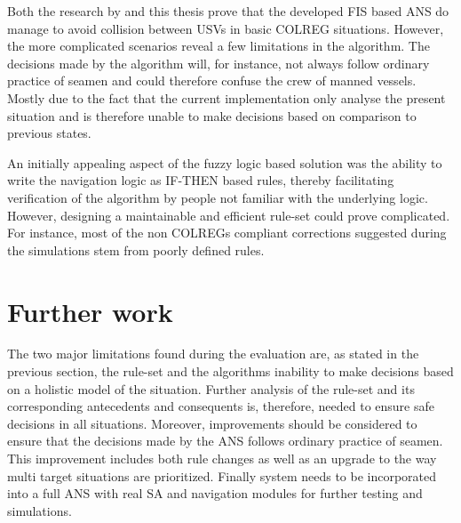 Both the research by \textcite{perera2012intelligent,perera2010smooth_param}  and this thesis prove that the developed FIS based ANS do manage to avoid collision between USVs in basic COLREG situations. However, the more complicated scenarios  reveal a few limitations in the algorithm. The decisions made by the algorithm will, for instance, not always follow ordinary practice of seamen and could therefore confuse the crew of manned vessels. Mostly due to the fact that the current implementation  only analyse the present situation and is therefore unable to make decisions based on comparison to previous states.

An initially appealing aspect of the fuzzy logic based solution was the ability to write the navigation logic as IF-THEN based rules, thereby facilitating verification of the algorithm by people not familiar with the underlying logic. However, designing a maintainable and efficient  rule-set could prove complicated. For instance, most of the non COLREGs compliant corrections suggested during the simulations stem from poorly defined rules.






\section{Further work}%
The two major limitations found during the evaluation are, as stated in the previous section, the rule-set and the algorithms inability to make decisions based on a holistic model of the situation.
Further analysis of the rule-set and its corresponding antecedents and consequents is, therefore, needed to ensure safe decisions in all situations. Moreover, improvements should be considered to ensure that the decisions made by the ANS follows ordinary practice of seamen. This improvement includes both rule changes as well as an upgrade to the way multi target situations are prioritized.
Finally system needs to be incorporated into a full ANS with real SA and navigation modules for further testing and simulations.
